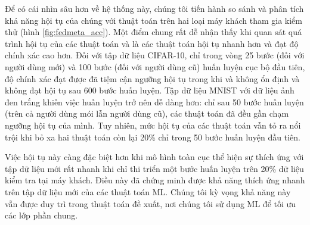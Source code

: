 \begin{table}[H]
    \centering
    \caption{Bảng độ chính xác (\%) của thuật toán FedAvg và các thuật toán FedMeta tính trên điểm dữ liệu (dữ liệu Non-IID)}
    \label{tab:acc_fedmeta}
\end{table}

Để có cái nhìn sâu hơn về hệ thống này, chúng tôi tiến hành so sánh và phân tích khả năng hội tụ của chúng với thuật toán  trên hai loại máy khách tham gia kiểm thử (hình \ref{fig:fedmeta_acc}). Một điểm chung rất dễ nhận thấy khi quan sát quá trình hội tụ của các thuật toán  và  là các thuật toán  hội tụ nhanh hơn và đạt độ chính xác cao hơn. Đối với tập dữ liệu CIFAR-10, chỉ trong vòng 25 bước (đối với người dùng mới) và 100 bước (đối với người dùng cũ) huấn luyện cục bộ đầu tiên, độ chính xác đạt được đã tiệm cận ngưỡng hội tụ trong khi  và  không ổn định và không đạt hội tụ sau 600 bước huấn luyện. Tập dữ liệu MNIST với dữ liệu ảnh đen trắng khiến việc huấn luyện trở nên dễ dàng hơn: chỉ sau 50 bước huấn luyện (trên cả người dùng mói lẫn người dùng cũ), các thuật toán đã đều gần chạm ngưỡng hội tụ của mình. Tuy nhiên, mức hội tụ của các thuật toán  vẫn tỏ ra nổi trội khi bỏ xa hai thuật toán còn lại 20\% chỉ trong 50 bước huấn luyện đầu tiên.

Việc hội tụ này càng đặc biệt hơn khi mô hình toàn cục thể hiện sự thích ứng với tập dữ liệu mới rất nhanh khi chỉ thi triển một bước huấn luyện trên 20\% dữ liệu kiểm tra tại máy khách. Điều này đã chứng minh được khả năng thích ứng nhanh trên tập dữ liệu mới của các thuật toán ML. Chúng tôi kỳ vọng khả năng này vẫn được duy trì trong thuật toán đề xuất, nơi chúng tôi sử dụng ML để tối ưu các lớp phần chung.

